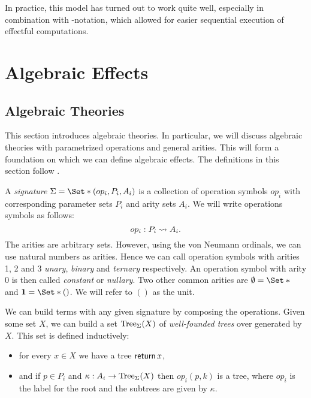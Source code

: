 In practice, this model has turned out to work quite well, especially in combination with -notation, which allowed for easier sequential execution of effectful computations.

\section{Algebraic Effects}\label{sec:alg}


\subsection{Algebraic Theories}

This section introduces algebraic theories. In particular, we will discuss algebraic theories with parametrized operations and general arities. This will form a foundation on which we can define algebraic effects. The definitions in this section follow \textcite{bauer_what_2018}.


\begin{definition}[Signature]
    A \emph{signature} $\Sig = \S{(op_i, P_i, A_i)}$ is a collection of operation symbols $op_i$ with corresponding parameter sets $P_i$ and arity sets $A_i$. We will write operations symbols as follows:
    \[ op_i : P_i \rightsquigarrow A_i. \]
    The arities are arbitrary sets. However, using the von Neumann ordinals, we can use natural numbers as arities. Hence we can call operation symbols with arities 1, 2 and 3 \emph{unary}, \emph{binary} and \emph{ternary} respectively. An operation symbol with arity $0$ is then called \emph{constant} or \emph{nullary}. Two other common arities are $\emptyset = \S{}$ and $\mathbf{1} = \S{()}$. We will refer to $()$ as the unit.
\end{definition}

We can build terms with any given signature by composing the operations. Given some set $X$, we can build a set $\operatorname{Tree}_\Sigma(X)$ of \emph{well-founded trees} over \Sig generated by $X$. This set is defined inductively:
\begin{itemize}
    \item for every $x\in X$ we have a tree $\operatorname{\mathsf{return}} x$,
    \item and if $p\in P_i$ and $\kappa : A_i \to \operatorname{Tree}_\Sigma(X)$ then $op_i(p,k)$ is a tree, where $op_i$ is the label for the root and the subtrees are given by $\kappa$.
\end{itemize}

